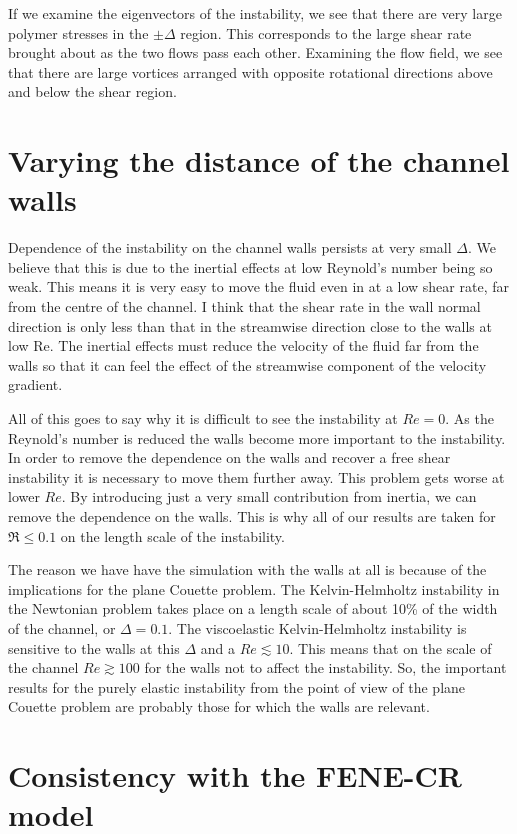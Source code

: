 \documentclass{article}
\begin{document}
If we examine the eigenvectors of the instability, we see that there are very large polymer stresses in the $\pm \Delta$ region. This corresponds to the large shear rate brought about as the two flows pass each other. Examining the flow field, we see that there are large vortices arranged with opposite rotational directions above and below the shear region. 

\section{Varying the distance of the channel walls}

Dependence of the instability on the channel walls persists at very small $\Delta$. We believe that this is due to the inertial effects at low Reynold's number being so weak. This means it is very easy to move the fluid even in at a low shear rate, far from the centre of the channel. I think that the shear rate in the wall normal direction is only less than that in the streamwise direction close to the walls at low Re. The inertial effects must reduce the velocity of the fluid far from the walls so that it can feel the effect of the streamwise component of the velocity gradient.

All of this goes to say why it is difficult to see the instability at $Re = 0$. As the Reynold's number is reduced the walls become more important to the instability. In order to remove the dependence on the walls and recover a free shear instability it is necessary to move them further away. This problem gets worse at lower $Re$. By introducing just a very small contribution from inertia, we can remove the dependence on the walls. This is why all of our results are taken for $\Re \leq 0.1$ on the length scale of the instability.

The reason we have have the simulation with the walls at all is because of the implications for the plane Couette problem. The Kelvin-Helmholtz instability in the Newtonian problem takes place on a length scale of about 10\% of the width of the channel, or $\Delta = 0.1$. The viscoelastic Kelvin-Helmholtz instability is sensitive to the walls at this $\Delta$ and a $Re \lesssim 10$. This means that on the scale of the channel $Re \gtrsim 100$ for the walls not to affect the instability. So, the important results for the purely elastic instability from the point of view of the plane Couette problem are probably those for which the walls are relevant. 


\section{Consistency with the FENE-CR model}
\end{document}
